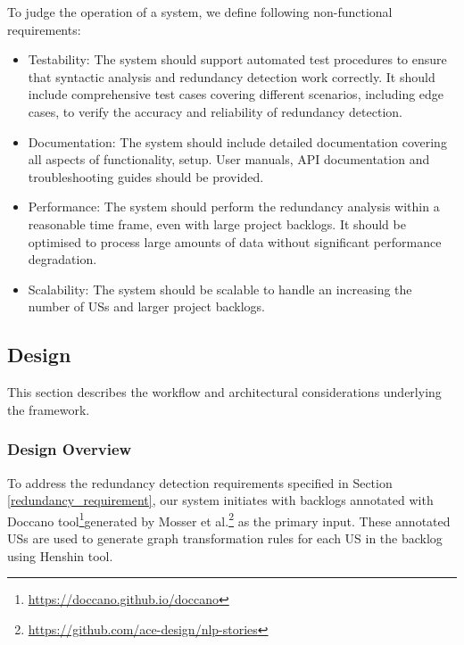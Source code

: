 To judge the operation of a system, we define following non-functional requirements:
\begin{itemize}
	\item Testability: The system should support automated test procedures to ensure that syntactic analysis and redundancy detection work correctly. It should include comprehensive test cases covering different scenarios, including edge cases, to verify the accuracy and reliability of redundancy detection.
	
	\item Documentation: The system should include detailed documentation covering all aspects of functionality, setup. User manuals, API documentation and troubleshooting guides should be provided. 
	
	\item Performance: The system should perform the redundancy analysis within a reasonable time frame, even with large project backlogs. It should be optimised to process large amounts of data without significant performance degradation.
	
	\item Scalability: The system should be scalable to handle an increasing the number of USs and larger project backlogs.

\end{itemize}

\subsection{Design}\label{desing}
This section describes the workflow and architectural considerations underlying the framework.
\subsubsection*{Design Overview}
To address the redundancy detection requirements specified in Section \ref{redundancy_requirement}, our system initiates with backlogs annotated with Doccano tool\footnote{\href{https://doccano.github.io/doccano}{https://doccano.github.io/doccano}}generated by Mosser et al.\footnote{\href{https://github.com/ace-design/nlp-stories}{https://github.com/ace-design/nlp-stories}} as the primary input\cite{arulmohan2023extracting}. These annotated USs are used to generate graph transformation rules for each US in the backlog using Henshin tool.

